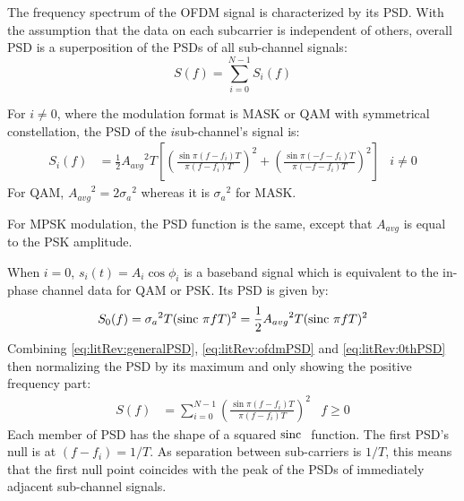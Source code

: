 The frequency spectrum of the \gls{OFDM} signal is characterized by its \gls{PSD}. With the assumption that the data on each subcarrier is independent of others, overall \gls{PSD} is a superposition of the PSDs of all sub-channel signals\cite{fuqin}:
\begin{equation}
	S(f) = \sum_{i=0}^{N-1}S_i(f)
	\label{eq:litRev:generalPSD}
\end{equation}
\begin{mathDef}
\end{mathDef}
For \(i \neq 0\), where the modulation format is \gls{MASK} or \gls{QAM} with symmetrical constellation, the PSD of the \(i\)\nth sub-channel's signal is:
\begin{align}
	S_i(f) &= \frac{1}{2}{A_{avg}}^2T \left[ \left(\frac{\sin \pi(f-f_i)T}{\pi(f-f_i)T}\right)^2 + \left(\frac{\sin \pi(-f -f_i)T}{\pi(-f-f_i)T}\right)^2\right] & i\neq 0
	\label{eq:litRev:ofdmPSD}
\end{align}
For QAM, \({A_{avg}}^2 = 2{\sigma_a}^2\) whereas it is \({\sigma_a}^2\) for \gls{MASK}.
\begin{mathDef}
\end{mathDef}
For \gls{MPSK} modulation, the PSD function is the same, except that \(A_{avg}\) is equal to the \gls{PSK} amplitude.

When \(i=0\), \(s_i(t) = A_i \cos \phi_i\) is a baseband signal which is equivalent to the in-phase channel data for \gls{QAM} or \gls{PSK}. Its \gls{PSD} is given by:
\begin{equation}
	S_0(f) = {\sigma_a}^2T (\text{sinc~} \pi f T)^2 = \frac{1}{2}{A_{avg}}^2T(\text{sinc~} \pi f T)^2
	\label{eq:litRev:0thPSD}
\end{equation}
Combining \eqref{eq:litRev:generalPSD}, \eqref{eq:litRev:ofdmPSD} and \eqref{eq:litRev:0thPSD} then normalizing the PSD by its maximum and only showing the positive frequency part:
\begin{align}
	S(f) &= \sum_{i=0}^{N-1} \left( \frac{\sin \pi(f - f_i)T}{\pi(f - f_i)T} \right)^2 & f \geq 0
	\label{eq:litRev:simplePSD}
\end{align}
Each member of PSD has the shape of a squared \(\text{sinc~}\) function. The first PSD's null is at \((f-f_i) = 1/T\). As separation between sub-carriers is \(1/T\), this means that the first null point coincides with the peak of the PSDs of immediately adjacent sub-channel signals.

